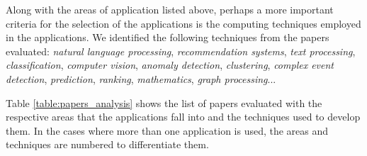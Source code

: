 \documentclass[ppgc,diss,english]{iiufrgs}
\begin{document}
Along with the areas of application listed above, perhaps a more important criteria for the selection of the applications is the computing techniques employed in the applications. We identified the following techniques from the papers evaluated: \emph{natural language processing}, \emph{recommendation systems}, \emph{text processing}, \emph{classification}, \emph{computer vision}, \emph{anomaly detection}, \emph{clustering}, \emph{complex event detection}, \emph{prediction}, \emph{ranking}, \emph{mathematics}, \emph{graph processing}...

Table \ref{table:papers_analysis} shows the list of papers evaluated with the respective areas that the applications fall into and the techniques used to develop them. In the cases where more than one application is used, the areas and techniques are numbered to differentiate them.


\end{document}
